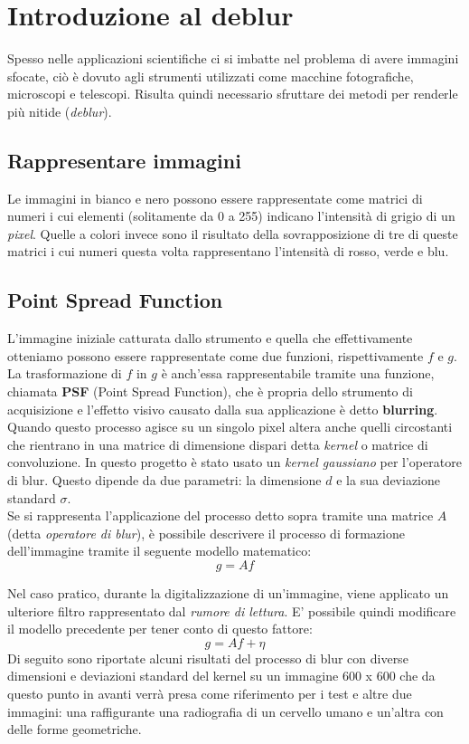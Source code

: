 \documentclass{article}
\begin{document}
\newpage
\tableofcontents
\newpage

\section{Introduzione al deblur}
Spesso nelle applicazioni scientifiche ci si imbatte nel problema di avere immagini sfocate, ciò è dovuto agli strumenti utilizzati come macchine fotografiche, microscopi e telescopi. Risulta quindi necessario sfruttare dei metodi per renderle più nitide (\textit{deblur}).

\subsection{Rappresentare immagini}
Le immagini in bianco e nero possono essere rappresentate come matrici di numeri i cui elementi (solitamente da 0 a 255) indicano l’intensità di grigio di un \textit{pixel}. Quelle a colori invece sono il risultato della sovrapposizione di tre di queste matrici i cui numeri questa volta rappresentano l'intensità di rosso, verde e blu.

\subsection{Point Spread Function}
L'immagine iniziale catturata dallo strumento e quella che effettivamente otteniamo possono  essere rappresentate come due funzioni, rispettivamente $f$ e $g$. La trasformazione di $f$ in $g$ è anch'essa rappresentabile tramite una funzione, chiamata \textbf{PSF} (Point Spread Function), che è propria dello strumento di acquisizione e l'effetto visivo causato dalla sua applicazione è detto \textbf{blurring}. Quando questo processo agisce su un singolo pixel altera anche quelli circostanti che rientrano in una matrice di dimensione dispari detta \textit{kernel} o matrice di convoluzione. In questo progetto è stato usato un \textit{kernel gaussiano} per l'operatore di blur. Questo dipende da due parametri: la dimensione $d$ e la sua deviazione standard $\sigma$.
\\
Se si rappresenta l'applicazione del processo detto sopra tramite una matrice $A$ (detta \textit{operatore di blur}), è possibile descrivere il processo di formazione dell'immagine tramite il seguente modello matematico: $$ g = Af $$ 


Nel caso pratico, durante la digitalizzazione di un'immagine, viene applicato un ulteriore filtro rappresentato dal \textit{rumore di lettura}. E' possibile quindi modificare il modello precedente per tener conto di questo fattore: $$ g = Af + \eta $$
Di seguito sono riportate alcuni risultati del processo di blur con diverse dimensioni e deviazioni standard  del kernel su un immagine 600 x 600 che da questo punto in avanti verrà presa come riferimento per i test e altre due immagini: una raffigurante una radiografia di un cervello umano e un'altra con delle forme geometriche.
\end{document}
